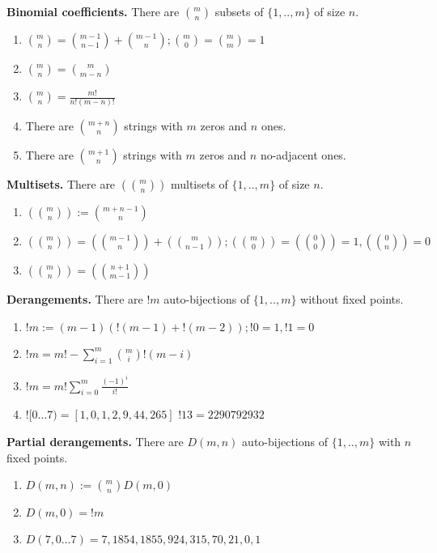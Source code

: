 \def\multiset#1#2{\left( \binom{#1}{#2} \right)}

\textbf{Binomial coefficients.} There are $\binom{m}{n}$ subsets of $\{1,..,m\}$ of size $n$.
\begin{enumerate}
\item $\binom{m}{n} = \binom{m-1}{n-1} + \binom{m-1}{n} ; \binom{m}{0} = \binom{m}{m} = 1$
\item $\binom{m}{n} = \binom{m}{m-n} $
\item $\binom{m}{n} = \frac{m!}{n!(m-n)!}$
\item There are $\binom{m+n}{n}$ strings with $m$ zeros and $n$ ones.
\item There are $\binom{m+1}{n}$ strings with $m$ zeros and $n$ no-adjacent ones.
\end{enumerate}

\textbf{Multisets.} There are $\multiset{m}{n}$ multisets of $\{1,..,m\}$ of size $n$.
\begin{enumerate}
\item $\multiset{m}{n} := \binom{m+n-1}{n}$
\item $\multiset{m}{n} = \multiset{m-1}{n} + \multiset{m}{n-1} ; \multiset{m}{0} = \multiset{0}{0} =  1, \multiset{0}{n} = 0$
\item $\multiset{m}{n} = \multiset{n+1}{m-1}$

\end{enumerate}

\textbf{Derangements.} There are $!m$ auto-bijections of $\{1,..,m\}$ without fixed points.
\begin{enumerate}
\item $!m := (m-1)(!(m-1)+!(m-2)) ; !0=1, !1=0$
\item $!m = m!-\sum_{i=1}^m \binom{m}{i}!(m-i)$
\item $!m = m!\sum_{i=0}^m \frac{(-1)^i}{i!}$
\item $![0\dots 7) = [1, 0, 1, 2, 9, 44, 265]$
$!13 = 2290792932$
\end{enumerate}

\textbf{Partial derangements.} There are $D(m,n)$ auto-bijections of $\{1,..,m\}$ with $n$ fixed points.
\begin{enumerate}
\item $D(m,n) := \binom{m}{n} D(m,0)$
\item $D(m,0) = !m$
\item $D(7,0\dots 7) = 7,1854,1855,924,315,70,21,0,1$\\
\end{enumerate}

